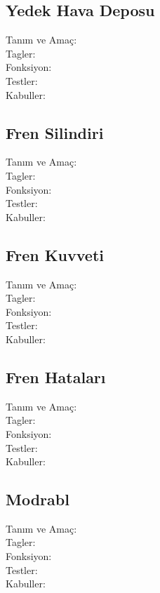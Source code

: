 \documentclass[10pt,a4paper]{article}
\begin{document}
\subsection{Yedek Hava Deposu}
\begin{description}
\item[Tanım ve Amaç:] 
\item[Tagler:]
\item[Fonksiyon:]
\item[Testler:]
\item[Kabuller:]
\end{description}
\newpage

\subsection{Fren Silindiri}
\begin{description}
\item[Tanım ve Amaç:] 
\item[Tagler:]
\item[Fonksiyon:]
\item[Testler:]
\item[Kabuller:]
\end{description}
\newpage

\subsection{Fren Kuvveti}
\begin{description}
\item[Tanım ve Amaç:] 
\item[Tagler:]
\item[Fonksiyon:]
\item[Testler:]
\item[Kabuller:]
\end{description}
\newpage

\subsection{Fren Hataları}
\begin{description}
\item[Tanım ve Amaç:] 
\item[Tagler:]
\item[Fonksiyon:]
\item[Testler:]
\item[Kabuller:]
\end{description}
\newpage

\subsection{Modrabl}
\begin{description}
\item[Tanım ve Amaç:] 
\item[Tagler:]
\item[Fonksiyon:]
\item[Testler:]
\item[Kabuller:]
\end{description}
\newpage
\end{document}
